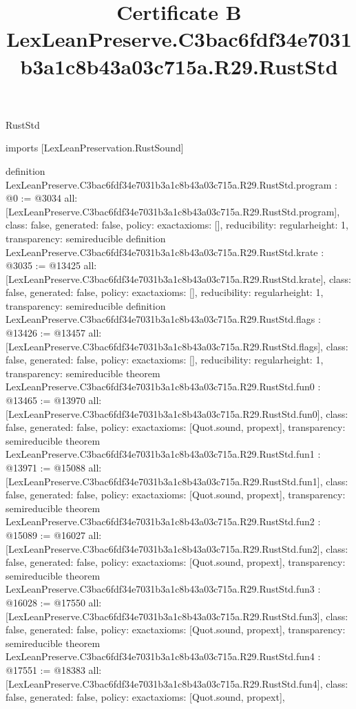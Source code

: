 \begin{lexlean}{RustStd}
\title{Certificate B LexLeanPreserve.C3bac6fdf34e7031b3a1c8b43a03c715a.R29.RustStd}
\begin{coremodule}
imports [LexLeanPreservation.RustSound]

definition LexLeanPreserve.C3bac6fdf34e7031b3a1c8b43a03c715a.R29.RustStd.program : @0 := @3034 {
  all: [LexLeanPreserve.C3bac6fdf34e7031b3a1c8b43a03c715a.R29.RustStd.program],
  class: false,
  generated: false,
  policy: exact{axioms: []},
  reducibility: regular{height: 1},
  transparency: semireducible
}
definition LexLeanPreserve.C3bac6fdf34e7031b3a1c8b43a03c715a.R29.RustStd.krate : @3035 := @13425 {
  all: [LexLeanPreserve.C3bac6fdf34e7031b3a1c8b43a03c715a.R29.RustStd.krate],
  class: false,
  generated: false,
  policy: exact{axioms: []},
  reducibility: regular{height: 1},
  transparency: semireducible
}
definition LexLeanPreserve.C3bac6fdf34e7031b3a1c8b43a03c715a.R29.RustStd.flags : @13426 := @13457 {
  all: [LexLeanPreserve.C3bac6fdf34e7031b3a1c8b43a03c715a.R29.RustStd.flags],
  class: false,
  generated: false,
  policy: exact{axioms: []},
  reducibility: regular{height: 1},
  transparency: semireducible
}
theorem LexLeanPreserve.C3bac6fdf34e7031b3a1c8b43a03c715a.R29.RustStd.fun0 : @13465 := @13970 {
  all: [LexLeanPreserve.C3bac6fdf34e7031b3a1c8b43a03c715a.R29.RustStd.fun0],
  class: false,
  generated: false,
  policy: exact{axioms: [Quot.sound, propext]},
  transparency: semireducible
}
theorem LexLeanPreserve.C3bac6fdf34e7031b3a1c8b43a03c715a.R29.RustStd.fun1 : @13971 := @15088 {
  all: [LexLeanPreserve.C3bac6fdf34e7031b3a1c8b43a03c715a.R29.RustStd.fun1],
  class: false,
  generated: false,
  policy: exact{axioms: [Quot.sound, propext]},
  transparency: semireducible
}
theorem LexLeanPreserve.C3bac6fdf34e7031b3a1c8b43a03c715a.R29.RustStd.fun2 : @15089 := @16027 {
  all: [LexLeanPreserve.C3bac6fdf34e7031b3a1c8b43a03c715a.R29.RustStd.fun2],
  class: false,
  generated: false,
  policy: exact{axioms: [Quot.sound, propext]},
  transparency: semireducible
}
theorem LexLeanPreserve.C3bac6fdf34e7031b3a1c8b43a03c715a.R29.RustStd.fun3 : @16028 := @17550 {
  all: [LexLeanPreserve.C3bac6fdf34e7031b3a1c8b43a03c715a.R29.RustStd.fun3],
  class: false,
  generated: false,
  policy: exact{axioms: [Quot.sound, propext]},
  transparency: semireducible
}
theorem LexLeanPreserve.C3bac6fdf34e7031b3a1c8b43a03c715a.R29.RustStd.fun4 : @17551 := @18383 {
  all: [LexLeanPreserve.C3bac6fdf34e7031b3a1c8b43a03c715a.R29.RustStd.fun4],
  class: false,
  generated: false,
  policy: exact{axioms: [Quot.sound, propext]},
}
\end{coremodule}
\end{lexlean}
